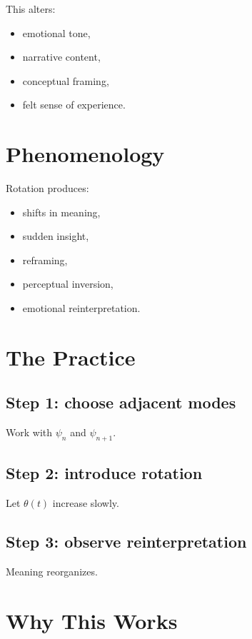 \documentclass[12pt]{article}
\begin{document}
This alters:

\begin{itemize}
    \item emotional tone,
    \item narrative content,
    \item conceptual framing,
    \item felt sense of experience.
\end{itemize}

\section{Phenomenology}

Rotation produces:

\begin{itemize}
    \item shifts in meaning,
    \item sudden insight,
    \item reframing,
    \item perceptual inversion,
    \item emotional reinterpretation.
\end{itemize}

\section{The Practice}

\subsection*{Step 1: choose adjacent modes}

Work with $\psi_n$ and $\psi_{n+1}$.

\subsection*{Step 2: introduce rotation}

Let $\theta(t)$ increase slowly.

\subsection*{Step 3: observe reinterpretation}

Meaning reorganizes.

\section{Why This Works}
\end{document}
